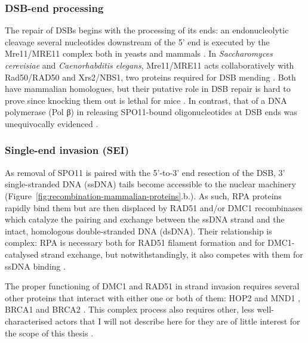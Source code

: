 \subsubsection{DSB-end processing}
The repair of DSBs begins with the processing of its ends: an endonucleolytic cleavage several nucleotides downstream of the 5' end \citep{neale2005endonucleolytic} is executed by the Mre11/MRE11 complex both in yeasts \citep[reviewed in][]{borde2009double} and mammals \citep[reviewed in][]{borde2007multiple}.
In \textit{Saccharomyces cerevisiae} and \textit{Caenorhabditis elegans}, Mre11/MRE11 acts collaboratively with Rad50/RAD50 and Xrs2/NBS1, two proteins required for DSB mending \citep[reviewed in][]{lam2015mechanism}. 
Both have mammalian homologues, but their putative role in DSB repair \citep[reviewed in][]{baudat2013meiotic} is hard to prove since knocking them out is lethal for mice \citep{luo1999disruption,zhu2001targeted}.
In contrast, that of a DNA polymerase (Pol \textgreek{β}) in releasing SPO11-bound oligonucleotides at DSB ends was unequivocally evidenced \citep[reviewed in \citealp{baudat2013meiotic}]{kidane2010dna}.



\subsubsection{Single-end invasion (SEI)}
As removal of SPO11 is paired with the 5’-to-3’ end resection of the DSB, 3’ single-stranded DNA (ssDNA) tails become accessible to the nuclear machinery (Figure~\ref{fig:recombination-mammalian-proteins}.b.).
As such, RPA proteins rapidly bind them \citep{he1995rpa} but are then displaced by RAD51 and/or DMC1 recombinases \citep{pittman1998meiotic,yoshida1998mouse} which catalyze the pairing and exchange between the ssDNA strand and the intact, homologous double-stranded DNA (dsDNA).
Their relationship is complex: RPA is necessary both for RAD51 filament formation and for DMC1-catalysed strand exchange, but notwithstandingly, it also competes with them for ssDNA binding \citep{sung2003rad51}.

The proper functioning of DMC1 and RAD51 in strand invasion requires several other proteins that interact with either one or both of them: HOP2 and MND1 \citep{bugreev2014hop2mnd1}, BRCA1 \citep{scully1997association} and BRCA2 \citep{thorslund2007interactions}.
This complex process also requires other, less well-characterised actors that I will not describe here for they are of little interest for the scope of this thesis \citep[but for review, see][and Figure~\ref{fig:recombination-mammalian-proteins}.c.]{neale2006clarifying}.

